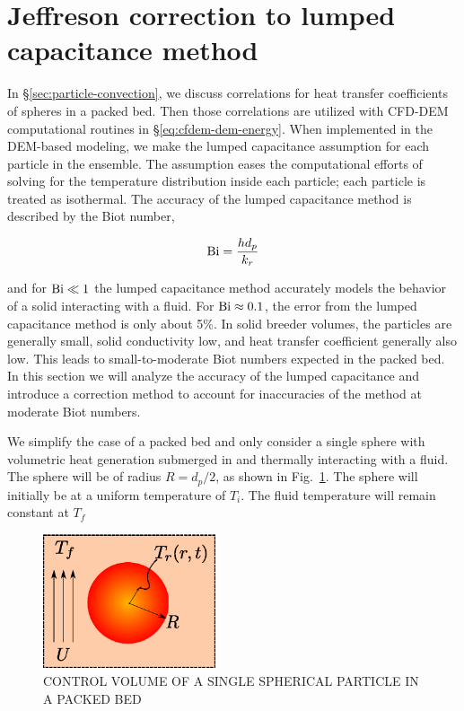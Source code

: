 \section{Jeffreson correction to lumped capacitance method}\label{sec:ht-jeffreson-correction}
In \S\ref{sec:particle-convection}, we discuss correlations for heat transfer coefficients of spheres in a packed bed. Then those correlations are utilized with CFD-DEM computational routines in \S\ref{eq:cfdem-dem-energy}. When implemented in the DEM-based modeling, we make the lumped capacitance assumption for each particle in the ensemble. The assumption eases the computational efforts of solving for the temperature distribution inside each particle; each particle is treated as isothermal. The accuracy of the lumped capacitance method is described by the Biot number,

\begin{equation}
     \mathrm{Bi} = \frac{hd_p}{k_r}
\end{equation} 

and for $\mathrm{Bi} \ll 1$ the lumped capacitance method accurately models the behavior of a solid interacting with a fluid. For $\mathrm{Bi} \approx 0.1$, the error from the lumped capacitance method is only about 5\%. In solid breeder volumes, the particles are generally small, solid conductivity low, and heat transfer coefficient generally also low. This leads to small-to-moderate Biot numbers expected in the packed bed. In this section we will analyze the accuracy of the lumped capacitance and introduce a correction method to account for inaccuracies of the method at moderate Biot numbers.

We simplify the case of a packed bed and only consider a single sphere with volumetric heat generation submerged in and thermally interacting with a fluid. The sphere will be of radius $R=d_p/2$, as shown in Fig.~\ref{fig:ParticleControlVolume}. The sphere will initially be at a uniform temperature of $T_i$. The fluid temperature will remain constant at $T_f$

\begin{figure}[ht]
	\centering
		\includegraphics[width=2in]{chapters/figures/ParticleControlVolume}
	\caption[Control volume of single spherical particle in a packed bed]{CONTROL VOLUME OF A SINGLE SPHERICAL PARTICLE IN A PACKED BED}
	\label{fig:ParticleControlVolume}
\end{figure}


